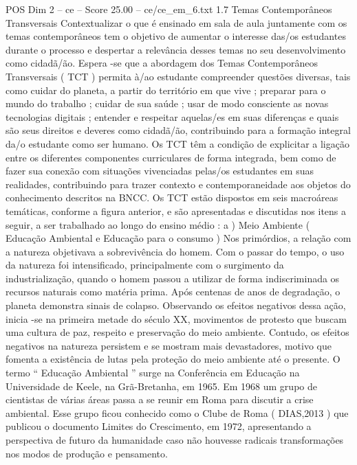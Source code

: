 \begin{textsample}{POS Dim 2 – ce – Score 25.00 – ce/ce\_em\_6.txt}  \label{ex:f2_pos_087}
1.7 Temas Contemporâneos Transversais Contextualizar o que é ensinado em sala de aula juntamente com os temas contemporâneos tem o objetivo de aumentar o interesse das/os estudantes durante o processo e despertar a relevância desses temas no seu desenvolvimento como cidadã/ão.
Espera -se que a abordagem dos Temas Contemporâneos Transversais ( TCT ) permita à/ao estudante compreender questões diversas, tais como cuidar do planeta, a partir do território em que vive ; preparar para o mundo do trabalho ; cuidar de sua saúde ; usar de modo consciente as novas tecnologias digitais ; entender e respeitar aquelas/es em suas diferenças e quais são seus direitos e deveres como cidadã/ão, contribuindo para a formação integral da/o estudante como ser humano.
Os TCT têm a condição de explicitar a ligação entre os diferentes componentes curriculares de forma integrada, bem como de fazer sua conexão com situações vivenciadas pelas/os estudantes em suas realidades, contribuindo para trazer contexto e contemporaneidade aos objetos do conhecimento descritos na BNCC.
Os TCT estão dispostos em seis macroáreas temáticas, conforme a figura anterior, e são apresentadas e discutidas nos itens a seguir, a ser trabalhado ao longo do ensino médio : a ) Meio Ambiente ( Educação Ambiental e Educação para o consumo ) Nos primórdios, a relação com a natureza objetivava a sobrevivência do homem.
Com o passar do tempo, o uso da natureza foi intensificado, principalmente com o surgimento da industrialização, quando o homem passou a utilizar de forma indiscriminada os recursos naturais como matéria prima.
Após centenas de anos de degradação, o planeta demonstra sinais de colapso.
Observando os efeitos negativos dessa ação, inicia -se na primeira metade do século XX, movimentos de protesto que buscam uma cultura de paz, respeito e preservação do meio ambiente.
Contudo, os efeitos negativos na natureza persistem e se mostram mais devastadores, motivo que fomenta a existência de lutas pela proteção do meio ambiente até o presente.
O termo “ Educação Ambiental ” surge na Conferência em Educação na Universidade de Keele, na Grã-Bretanha, em 1965.
Em 1968 um grupo de cientistas de várias áreas passa a se reunir em Roma para discutir a crise ambiental.
Esse grupo ficou conhecido como o Clube de Roma ( DIAS,2013 ) que publicou o documento Limites do Crescimento, em 1972, apresentando a perspectiva de futuro da humanidade caso não houvesse radicais transformações nos modos de produção e pensamento.

\end{textsample}
